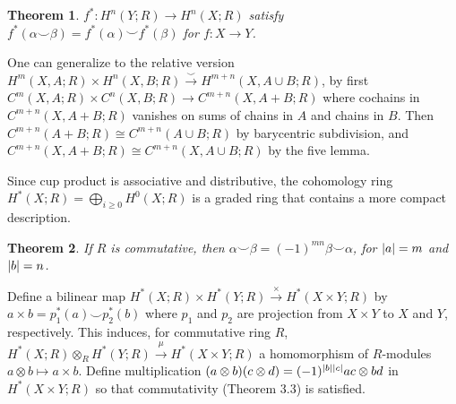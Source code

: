 \documentclass[11pt]{article}
\theoremstyle{definition}
\theoremstyle{plain}
\newtheorem{theorem}{Theorem}[section]
\newcommand{\1}{\mathbf{1}}
\begin{document}
\begin{theorem}
$f^\ast:H^n(Y;R)\to H^n(X;R)$ satisfy $f^\ast(\alpha\smile\beta)=f^\ast(\alpha)\smile f^\ast(\beta)$ for $f:X\to Y$.
\end{theorem}

One can generalize to the relative version $H^m(X,A;R)\times H^n(X,B;R)\xrightarrow{\smile}H^{m+n}(X,A\cup B;R)$, by first $C^m(X,A;R)\times C^n(X,B;R)\to C^{m+n}(X,A+B;R)$ where cochains in $C^{m+n}(X,A+B;R)$ vanishes on sums of chains in $A$ and chains in $B$. Then $C^{m+n}(A+B;R)\cong C^{m+n}(A\cup B;R)$ by barycentric subdivision, and $C^{m+n}(X,A+B;R)\cong C^{m+n}(X,A\cup B;R)$ by the five lemma.\medbreak

Since cup product is associative and distributive, the cohomology ring $H^\ast(X;R)=\bigoplus_{i\geq0}H^0(X;R)$ is a graded ring that contains a more compact description.

\begin{theorem}
If $R$ is commutative, then $\alpha\smile\beta=(-1)^{mn}\beta\smile\alpha$, for $\abs{a}=m$ and $\abs{b}=n$.
\end{theorem}

Define a bilinear map $H^\ast(X;R)\times H^\ast(Y;R)\xrightarrow{\times}H^\ast(X\times Y;R)$ by $a\times b=p_1^\ast(a)\smile p_2^\ast(b)$ where $p_1$ and $p_2$ are projection from $X\times Y$ to $X$ and $Y$, respectively. This induces, for commutative ring $R$, $H^\ast(X;R)\otimes_RH^\ast(Y;R)\xrightarrow{\mu}H^\ast(X\times Y;R)$ a homomorphism of $R$-modules $a\otimes b\mapsto a\times b$. Define multiplication $(a\otimes b)(c\otimes d)=(-1)^{\abs{b}\abs{c}}ac\otimes bd$ in $H^\ast(X\times Y;R)$ so that commutativity (Theorem 3.3) is satisfied.
\end{document}
